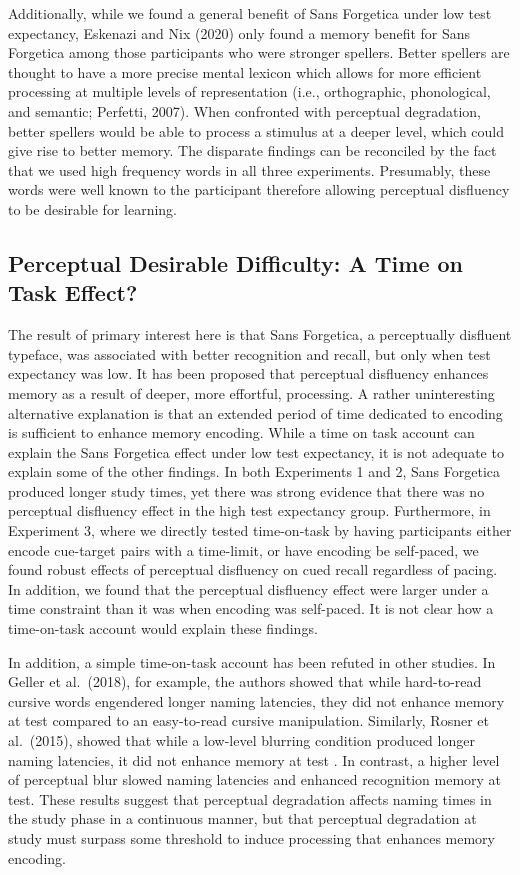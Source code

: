 \documentclass[
  english,
  jou]{apa7}
\begin{document}
Additionally, while we found a general benefit of Sans Forgetica under low test expectancy, Eskenazi and Nix (2020) only found a memory benefit for Sans Forgetica among those participants who were stronger spellers. Better spellers are thought to have a more precise mental lexicon which allows for more efficient processing at multiple levels of representation (i.e., orthographic, phonological, and semantic; Perfetti, 2007). When confronted with perceptual degradation, better spellers would be able to process a stimulus at a deeper level, which could give rise to better memory. The disparate findings can be reconciled by the fact that we used high frequency words in all three experiments. Presumably, these words were well known to the participant therefore allowing perceptual disfluency to be desirable for learning.

\hypertarget{perceptual-desirable-difficulty-a-time-on-task-effect}{%
\subsection{Perceptual Desirable Difficulty: A Time on Task Effect?}\label{perceptual-desirable-difficulty-a-time-on-task-effect}}

The result of primary interest here is that Sans Forgetica, a perceptually disfluent typeface, was associated with better recognition and recall, but only when test expectancy was low. It has been proposed that perceptual disfluency enhances memory as a result of deeper, more effortful, processing. A rather uninteresting alternative explanation is that an extended period of time dedicated to encoding is sufficient to enhance memory encoding. While a time on task account can explain the Sans Forgetica effect under low test expectancy, it is not adequate to explain some of the other findings. In both Experiments 1 and 2, Sans Forgetica produced longer study times, yet there was strong evidence that there was no perceptual disfluency effect in the high test expectancy group. Furthermore, in Experiment 3, where we directly tested time-on-task by having participants either encode cue-target pairs with a time-limit, or have encoding be self-paced, we found robust effects of perceptual disfluency on cued recall regardless of pacing. In addition, we found that the perceptual disfluency effect were larger under a time constraint than it was when encoding was self-paced. It is not clear how a time-on-task account would explain these findings.

In addition, a simple time-on-task account has been refuted in other studies. In Geller et al.~(2018), for example, the authors showed that while hard-to-read cursive words engendered longer naming latencies, they did not enhance memory at test compared to an easy-to-read cursive manipulation. Similarly, Rosner et al.~(2015), showed that while a low-level blurring condition produced longer naming latencies, it did not enhance memory at test . In contrast, a higher level of perceptual blur slowed naming latencies and enhanced recognition memory at test. These results suggest that perceptual degradation affects naming times in the study phase in a continuous manner, but that perceptual degradation at study must surpass some threshold to induce processing that enhances memory encoding.
\end{document}
